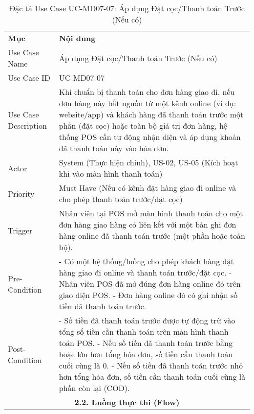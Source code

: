 \begin{longtable}{|m{4cm}|p{11cm}|}
\caption{Đặc tả Use Case UC-MD07-07: Áp dụng Đặt cọc/Thanh toán Trước (Nếu có)} \label{tab:uc_md07_07} \\
\hline

\endhead %
\hline
\endfoot %
\hline
\endlastfoot %
\multicolumn{2}{|c|}{\textbf{2.1. Tóm tắt (Summary)}} \\
\hline
\textbf{Mục} & \textbf{Nội dung} \\
\hline
Use Case Name & Áp dụng Đặt cọc/Thanh toán Trước (Nếu có) \\
\hline
Use Case ID & UC-MD07-07 \\
\hline
Use Case Description & Khi chuẩn bị thanh toán cho đơn hàng giao đi, nếu đơn hàng này bắt nguồn từ một kênh online (ví dụ: website/app) và khách hàng đã thanh toán trước một phần (đặt cọc) hoặc toàn bộ giá trị đơn hàng, hệ thống POS cần tự động nhận diện và áp dụng khoản đã thanh toán này vào hóa đơn. \\
\hline
Actor & System (Thực hiện chính), US-02, US-05 (Kích hoạt khi vào màn hình thanh toán) \\
\hline
Priority & Must Have (Nếu có kênh đặt hàng giao đi online và cho phép thanh toán trước/đặt cọc) \\
\hline
Trigger & Nhân viên tại POS mở màn hình thanh toán cho một đơn hàng giao hàng có liên kết với một bản ghi đơn hàng online đã thanh toán trước (một phần hoặc toàn bộ). \\
\hline
Pre-Condition & - Có một hệ thống/luồng cho phép khách hàng đặt hàng giao đi online và thanh toán trước/đặt cọc. \newline - Nhân viên POS đã mở đúng đơn hàng online đó trên giao diện POS. \newline - Đơn hàng online đó có ghi nhận số tiền đã thanh toán trước. \\
\hline
Post-Condition & - Số tiền đã thanh toán trước được tự động trừ vào tổng số tiền cần thanh toán trên màn hình thanh toán POS. \newline - Nếu số tiền đã thanh toán trước bằng hoặc lớn hơn tổng hóa đơn, số tiền cần thanh toán cuối cùng là 0. \newline - Nếu số tiền đã thanh toán trước nhỏ hơn tổng hóa đơn, số tiền cần thanh toán cuối cùng là phần còn lại (COD). \\
\hline
\multicolumn{2}{|c|}{\textbf{2.2. Luồng thực thi (Flow)}} \\
\hline

\end{longtable}
